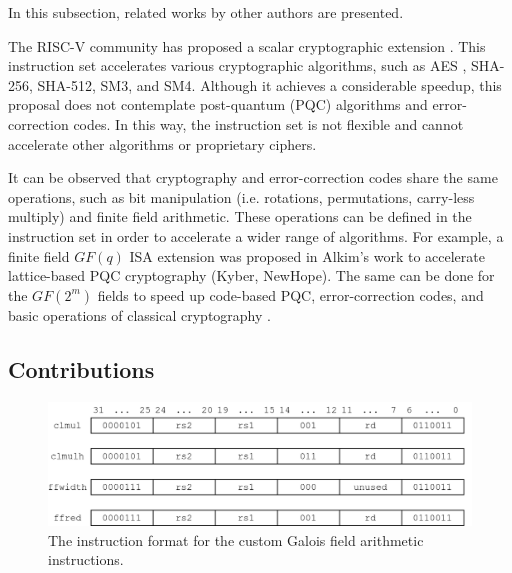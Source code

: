 In this subsection, related works by other authors are presented.

The RISC-V community has proposed a scalar cryptographic extension \cite{zehrisc}. This instruction set 
accelerates various cryptographic algorithms, such as AES \cite{Marshall_Newell_Page_Saarinen_Wolf_2020}, SHA-256, SHA-512, SM3, and SM4. 
Although it achieves a considerable speedup, this proposal does not contemplate 
post-quantum (PQC) algorithms and error-correction codes. In this way, the instruction set is not flexible 
and cannot accelerate other algorithms or proprietary ciphers.


It can be observed that cryptography and error-correction codes share the same operations, such as 
bit manipulation (i.e. rotations, permutations, carry-less multiply) and finite field arithmetic.
These operations can be defined in the instruction set in order to accelerate a wider range of algorithms.
For example, a finite field $GF(q)$ ISA extension 
was proposed in Alkim's \cite{Alkim_Evkan_Lahr_Niederhagen_Petri_2020} work to accelerate lattice-based PQC 
cryptography (Kyber, NewHope). The same can be done for the $GF(2^m)$ fields to speed up code-based PQC, 
error-correction codes, and basic operations of classical cryptography \cite{10.1145/944645.944659}.

\subsection{Contributions}

\begin{figure}[tp]
    \centering
    \includegraphics[width=0.8\linewidth]{img/instr.png}
    \caption{The instruction format for the custom Galois field arithmetic instructions.}
    \label{fig:instr}
\end{figure}


